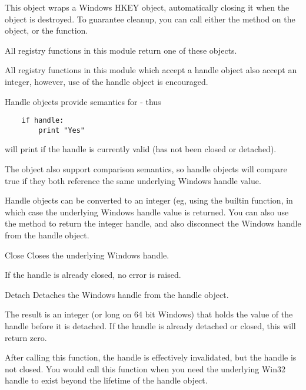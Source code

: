  This object wraps a Windows HKEY object, automatically closing it when
 the object is destroyed.  To guarantee cleanup, you can call either
 the  method on the object, or the 
  function.

 All registry functions in this module return one of these objects.

 All registry functions in this module which accept a handle object 
 also accept an integer, however, use of the handle object is 
 encouraged.
 
 Handle objects provide semantics for  - thus
\begin{verbatim}
    if handle:
        print "Yes"
\end{verbatim}
 will print  if the handle is currently valid (has not been
 closed or detached).

 The object also support comparison semantics, so handle
 objects will compare true if they both reference the same
 underlying Windows handle value.

 Handle objects can be converted to an integer (eg, using the
 builtin  function, in which case the underlying
 Windows handle value is returned.  You can also use the 
  method to return the integer handle, and
 also disconnect the Windows handle from the handle object.

\begin{methoddesc}{Close}{}
  Closes the underlying Windows handle.

  If the handle is already closed, no error is raised.
\end{methoddesc}


\begin{methoddesc}{Detach}{}
  Detaches the Windows handle from the handle object.

 The result is an integer (or long on 64 bit Windows) that holds
 the value of the handle before it is detached.  If the
 handle is already detached or closed, this will return zero.

 After calling this function, the handle is effectively invalidated,
 but the handle is not closed.  You would call this function when 
 you need the underlying Win32 handle to exist beyond the lifetime 
 of the handle object.
\end{methoddesc}
